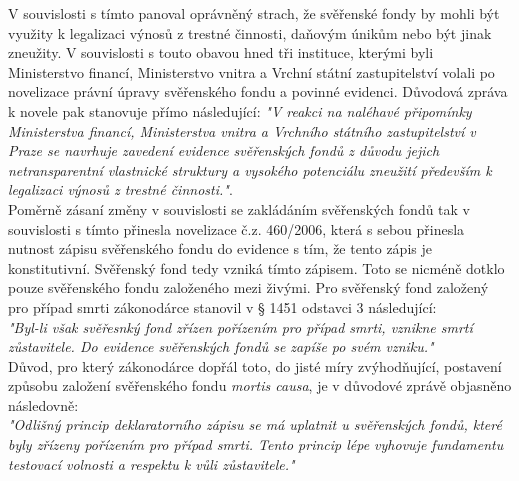 \documentclass{article}
\begin{document}
V souvislosti s tímto panoval oprávněný strach, že svěřenské fondy by mohli být využity k legalizaci výnosů z trestné činnosti, daňovým únikům nebo být jinak zneužity. V souvislosti s touto obavou hned tři instituce, kterými byli Ministerstvo financí, Ministerstvo vnitra a Vrchní státní zastupitelství volali po novelizace právní úpravy svěřenského fondu a povinné evidenci. Důvodová zpráva k novele pak stanovuje přímo následující: \textit{"V reakci na naléhavé připomínky Ministerstva financí, Ministerstva vnitra a Vrchního státního zastupitelství v Praze se navrhuje zavedení evidence svěřenských fondů z důvodu jejich netransparentní vlastnické struktury a vysokého potenciálu zneužití především k legalizaci výnosů z trestné činnosti."}.\\



Poměrně zásaní změny v souvislosti se zakládáním svěřenských fondů tak v souvislosti s tímto přinesla novelizace č.z. 460/2006, která s sebou přinesla nutnost zápisu svěřenského fondu do evidence s tím, že tento zápis je konstitutivní. Svěřenský fond tedy vzniká tímto zápisem. Toto se nicméně dotklo pouze svěřenského fondu založeného mezi živými. Pro svěřenský fond založený pro případ smrti zákonodárce stanovil v § 1451 odstavci 3 následující:\\

\textit{"Byl-li však svěřesnký fond zřízen pořízením pro případ smrti, vznikne smrtí zůstavitele. Do evidence svěřenských fondů se zapíše po svém vzniku."}\\

Důvod, pro který zákonodárce dopřál toto, do jisté míry zvýhodňující, postavení způsobu založení svěřenského fondu \textit{mortis causa}, je v důvodové zprávě objasněno následovně:\\

\textit{"Odlišný princip deklaratorního zápisu se má uplatnit u svěřenských fondů, které byly zřízeny pořízením pro případ smrti. Tento princip lépe vyhovuje fundamentu testovací volnosti a respektu k vůli zůstavitele."}
\end{document}
